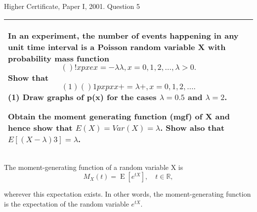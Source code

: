 \documentclass[a4paper,12pt]{article}
\begin{document}
Higher Certificate, Paper I, 2001. Question 5
\begin{table}[ht!]
 \centering
 \begin{tabular}{|p{15cm}|}
 \hline
\noindent In an experiment, the number of events happening in any unit time interval is a
Poisson random variable X with probability mass function
\[( ) !
x
p x e
x
= -\lambda \lambda , x = 0, 1, 2, … , \lambda > 0 .\]
Show that
\[( 1) ( )
1
px px
x
+ = \lambda
+
, x = 0, 1, 2, … .\]
(1)
Draw graphs of p(x) for the cases $\lambda = 0.5$ and $\lambda = 2$.

Obtain the moment generating function (mgf) of X and hence show that
$E(X) = Var(X) = \lambda$. Show also that $E[(X - \lambda)3] = \lambda$.
\\ \hline
  \end{tabular}
\end{table}

\begin{framed}
\noindent The moment-generating function of a random variable X is 
\[{\displaystyle M_{X}(t) = \operatorname{E} \left[e^{tX}\right],\quad t\in \mathbb{R} ,} \]

\noindent wherever this expectation exists. In other words, the moment-generating function is the expectation of the random variable 
${\displaystyle e^{tX}}. $
\end{framed}
\end{document}
